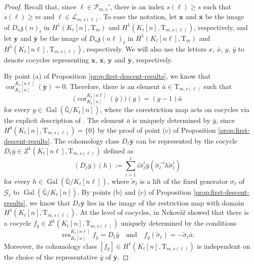 \documentclass[12pt,reqno]{amsart}
\theoremstyle{definition}
\theoremstyle{remark}
\newcommand{\numberset}{\mathbb}
\newcommand{\Q}{\numberset{Q}}
\newcommand{\T}{\boldsymbol{\mathrm{T}}}
\DeclareMathOperator{\Gal}{Gal}
\DeclareMathOperator{\Cor}{cor}
\DeclareMathOperator{\res}{res}
\newcommand{\gs}{\sigma}
\begin{document}
\begin{proof}
    Recall that, since $\ell\in\mathcal{P}_{m,s}'$, there is an index $s(\ell)\ge s$ such that $s(\ell)\ge m$ and $\ell\in \mathcal{L}_{m,s(\ell)}$. To ease the notation, let $\boldsymbol{x}$ and $\bar{\boldsymbol{x}}$ be the image of $D_n \mathfrak{z}(n)_{t}$ in $H^1(K_t[n],\T_m)$ and $H^1(K_t[n],\T_{m,s(\ell)})$, respectively, and let $\boldsymbol{y}$ and $\bar{\boldsymbol{y}}$ be the image of $D_n \mathfrak{z}(n\ell)_{t}$ in $H^1(K_t[n\ell],\T_m)$ and $H^1(K_t[n\ell],\T_{m,s(\ell)})$, respectively. We will also use the letters $x$, $\bar{x}$, $y$, $\bar{y}$ to denote cocycles representing $\boldsymbol{x}$, $\bar{\boldsymbol{x}}$, $\boldsymbol{y}$ and $\bar{\boldsymbol{y}}$, respectively.

    By point (a) of Proposition \ref{prop:first-descent-results}, we know that $\Cor_{K_t[n]}^{K_t[n\ell]}(\bar{\boldsymbol{y}})=0$. Therefore, there is an element $\bar{a}\in \T_{m,s(\ell)}$ such that
    \begin{equation*}
        \big(\Cor_{K_t[n]}^{K_t[n\ell]}(\bar{y})\big)(g)=(g-1)\bar{a}
    \end{equation*}
    for every $g\in\Gal(\bar{\Q}/K_t[n])$, where the corestriction map acts on cocycles via the explicit description of \cite[p. 48]{Neukirch-Schmidt-Wingberg:cohomology-of-number-fields}. The element $\bar{a}$ is uniquely determined by $\bar{y}$, since $H^0(K_t[n],\T_{m,s(\ell)})=\{0\}$ by the proof of point (c) of Proposition \ref{prop:first-descent-results}. The cohomology class $D_\ell \bar{\boldsymbol{y}}$ can be represented by the cocycle $D_\ell \bar{y}\in Z^1(K_t[n\ell],\T_{m,s(\ell)})$ defined as
    \begin{equation*}
        (D_\ell \bar{y})(h):=\sum_{i=1}^\ell i\tilde{\gs}_\ell^i\bar{y}(\tilde{\gs}_\ell^{-i}h\tilde{\gs}_\ell^i)
    \end{equation*}
    for every $h\in\Gal(\bar{\Q}/K_t[n\ell])$, where $\tilde{\gs}_\ell$ is a lift of the fixed generator $\sigma_\ell$ of $\mathcal{G}_\ell$ to $\Gal(\bar{\Q}/K_t[n])$. By points (b) and (c) of Proposition \ref{prop:first-descent-results}, we know that $D_\ell \bar{\boldsymbol{y}}$ lies in the image of the restriction map with domain $H^1(K_t[n],\T_{m,s(\ell)})$. At the level of cocycles, in \cite[§7]{Nekovar92:chow-groups} Nekov\' a\v r showed that there is a cocycle $f_{\bar{y}}\in Z^1(K_t[n],\T_{m,s(\ell)})$ uniquely determined by the conditions
    \begin{equation}\label{eq:definition-fy}
        \res_{K_t[n]}^{K_t[n\ell]} f_{\bar{y}}=D_\ell\bar{y}\quad\text{and}\quad f_{\bar{y}}(\tilde{\gs}_\ell)=-\tilde{\gs}_\ell\bar{a}.
    \end{equation}
    Moreover, its cohomology class $[f_{\bar{y}}]\in H^1(K_t[n],\T_{m,s(\ell)})$ is independent on the choice of the representative $\bar{y}$ of $\bar{\boldsymbol{y}}$.


\end{proof}
\end{document}
